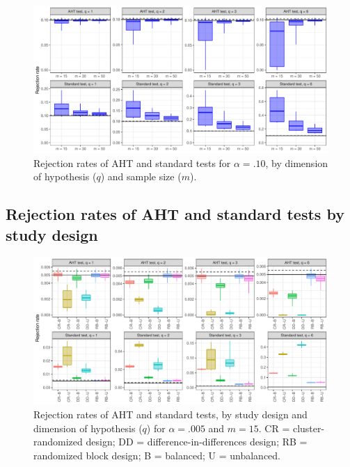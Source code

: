 \documentclass[12pt]{article}
\begin{document}
\begin{landscape}
\begin{figure}[p]
{\centering \includegraphics[width=\linewidth]{CR_fig/overview_10-1} 

}

\caption{Rejection rates of AHT and standard tests for $\alpha = .10$, by dimension of hypothesis ($q$) and sample size ($m$).}\label{fig:overview_10}
\end{figure}

\subsection{Rejection rates of AHT and standard tests by study design}

\begin{figure}[p]

{\centering \includegraphics[width=\linewidth]{CR_fig/balance_005_15-1} 

}

\caption{Rejection rates of AHT and standard tests, by study design and dimension of hypothesis ($q$) for $\alpha = .005$ and $m = 15$. CR = cluster-randomized design; DD = difference-in-differences design; RB = randomized block design; B = balanced; U = unbalanced.}\label{fig:balance_005_15}
\end{figure}


\end{landscape}
\end{document}
